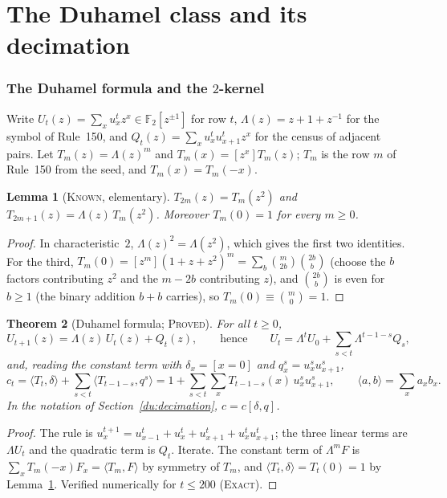 \documentclass[11pt]{article}
\newtheorem{theorem}{Theorem}[section]
\newtheorem{lemma}[theorem]{Lemma}
\theoremstyle{definition}
\theoremstyle{remark}
\newcommand{\F}{\mathbb{F}_2}
\newcommand{\PROVED}{\textsc{Proved}}
\newcommand{\EXACT}{\textsc{Exact}}
\newcommand{\KNOWN}{\textsc{Known}}
\begin{document}
\part{The Duhamel class and its decimation}

\section{The Duhamel formula and the \texorpdfstring{$2$}{2}-kernel}\label{du:prelim}

Write $U_t(z)=\sum_x u^t_x z^x\in\F[z^{\pm1}]$ for row $t$, $\Lambda(z)=z+1+z^{-1}$ for the symbol of Rule~150, and $Q_t(z)=\sum_x u^t_xu^t_{x+1}z^x$ for the census of adjacent pairs. Let $T_m(z)=\Lambda(z)^m$ and $T_m(x)=[z^x]T_m(z)$; $T_m$ is the row $m$ of Rule~150 from the seed, and $T_m(x)=T_m(-x)$.

\begin{lemma}[\KNOWN, elementary]\label{du:kernel}
$T_{2m}(z)=T_m(z^2)$ and $T_{2m+1}(z)=\Lambda(z)\,T_m(z^2)$. Moreover $T_m(0)=1$ for every $m\ge0$.
\end{lemma}
\begin{proof}
In characteristic~$2$, $\Lambda(z)^2=\Lambda(z^2)$, which gives the first two identities. For the third, $T_m(0)=[z^m](1+z+z^2)^m=\sum_{b}\binom{m}{2b}\binom{2b}{b}$ (choose the $b$ factors contributing $z^2$ and the $m-2b$ contributing $z$), and $\binom{2b}{b}$ is even for $b\ge1$ (the binary addition $b+b$ carries), so $T_m(0)\equiv\binom m0=1$.
\end{proof}

\begin{theorem}[Duhamel formula; \PROVED]\label{du:duhamel}
For all $t\ge0$,
\[
U_{t+1}(z)=\Lambda(z)\,U_t(z)+Q_t(z),\qquad\text{hence}\qquad
U_t=\Lambda^tU_0+\sum_{s<t}\Lambda^{t-1-s}Q_s ,
\]
and, reading the constant term with $\delta_x=[x=0]$ and $q^s_x=u^s_xu^s_{x+1}$,
\[
c_t=\langle T_t,\delta\rangle+\sum_{s<t}\langle T_{t-1-s},q^s\rangle
   =1+\sum_{s<t}\sum_xT_{t-1-s}(x)\,u^s_xu^s_{x+1},
\qquad \langle a,b\rangle=\sum_xa_xb_x .
\]
In the notation of Section~\ref{du:decimation}, $c=c[\delta,q]$.
\end{theorem}
\begin{proof}
The rule is $u^{t+1}_x=u^t_{x-1}+u^t_x+u^t_{x+1}+u^t_xu^t_{x+1}$; the three linear terms are $\Lambda U_t$ and the quadratic term is $Q_t$. Iterate. The constant term of $\Lambda^mF$ is $\sum_xT_m(-x)F_x=\langle T_m,F\rangle$ by symmetry of $T_m$, and $\langle T_t,\delta\rangle=T_t(0)=1$ by Lemma~\ref{du:kernel}. Verified numerically for $t\le200$ (\EXACT).
\end{proof}
\end{document}
